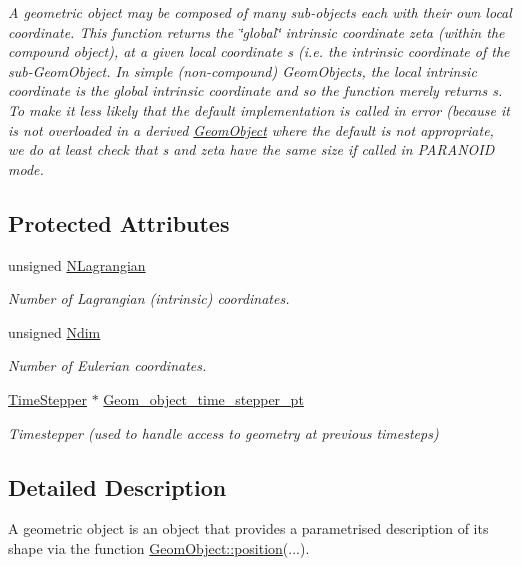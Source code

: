 \begin{DoxyCompactItemize}
\begin{DoxyCompactList}\small\item\em A geometric object may be composed of many sub-\/objects each with their own local coordinate. This function returns the \char`\"{}global\char`\"{} intrinsic coordinate zeta (within the compound object), at a given local coordinate s (i.\+e. the intrinsic coordinate of the sub-\/\+Geom\+Object. In simple (non-\/compound) Geom\+Objects, the local intrinsic coordinate is the global intrinsic coordinate and so the function merely returns s. To make it less likely that the default implementation is called in error (because it is not overloaded in a derived \hyperlink{classoomph_1_1GeomObject}{Geom\+Object} where the default is not appropriate, we do at least check that s and zeta have the same size if called in P\+A\+R\+A\+N\+O\+ID mode. \end{DoxyCompactList}\end{DoxyCompactItemize}
\subsection*{Protected Attributes}
\begin{DoxyCompactItemize}
\item 
unsigned \hyperlink{classoomph_1_1GeomObject_a11d8ac51be65ee822a6c782c5e079a2c}{N\+Lagrangian}
\begin{DoxyCompactList}\small\item\em Number of Lagrangian (intrinsic) coordinates. \end{DoxyCompactList}\item 
unsigned \hyperlink{classoomph_1_1GeomObject_a6351e2d8fbd54ff23498eb6f77c905cc}{Ndim}
\begin{DoxyCompactList}\small\item\em Number of Eulerian coordinates. \end{DoxyCompactList}\item 
\hyperlink{classoomph_1_1TimeStepper}{Time\+Stepper} $\ast$ \hyperlink{classoomph_1_1GeomObject_a158a36e0dbcaf236ffc351b76faaed53}{Geom\+\_\+object\+\_\+time\+\_\+stepper\+\_\+pt}
\begin{DoxyCompactList}\small\item\em Timestepper (used to handle access to geometry at previous timesteps) \end{DoxyCompactList}\end{DoxyCompactItemize}


\subsection{Detailed Description}
A geometric object is an object that provides a parametrised description of its shape via the function \hyperlink{classoomph_1_1GeomObject_a0d04c9d4667817f3ef24bb660fd56065}{Geom\+Object\+::position}(...).

